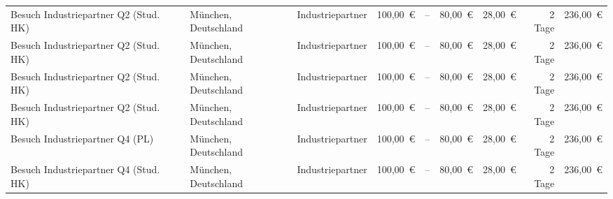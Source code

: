 \begin{table}[]
{\begin{tabular}{lllrrrrrr}
            Besuch Industriepartner Q2 (Stud. HK) & München, Deutschland & Industriepartner   & 100,00~€                                                     & --                                                      & 80,00~€                                                & 28,00~€                                                   & 2 Tage                                                 & 236,00~€                                                \\
            Besuch Industriepartner Q2 (Stud. HK) & München, Deutschland & Industriepartner   & 100,00~€                                                     & --                                                      & 80,00~€                                                & 28,00~€                                                   & 2 Tage                                                 & 236,00~€                                                \\
            Besuch Industriepartner Q2 (Stud. HK) & München, Deutschland & Industriepartner   & 100,00~€                                                     & --                                                      & 80,00~€                                                & 28,00~€                                                   & 2 Tage                                                 & 236,00~€                                                \\
            Besuch Industriepartner Q2 (Stud. HK) & München, Deutschland & Industriepartner   & 100,00~€                                                     & --                                                      & 80,00~€                                                & 28,00~€                                                   & 2 Tage                                                 & 236,00~€                                                \\
            Besuch Industriepartner Q4 (PL)       & München, Deutschland & Industriepartner   & 100,00~€                                                     & --                                                      & 80,00~€                                                & 28,00~€                                                   & 2 Tage                                                 & 236,00~€                                                \\
            Besuch Industriepartner Q4 (Stud. HK) & München, Deutschland & Industriepartner   & 100,00~€                                                     & --                                                      & 80,00~€                                                & 28,00~€                                                   & 2 Tage                                                 & 236,00~€                                                \\

\end{tabular}}
\end{table}
